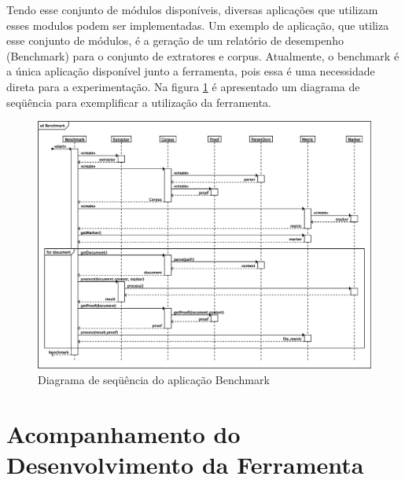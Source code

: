\documentclass[12pt, a4paper]{article}
\begin{document}
Tendo esse conjunto de módulos disponíveis, diversas aplicações que
utilizam esses modulos podem ser implementadas.
Um exemplo de aplicação, que utiliza esse conjunto de módulos, é a geração de
um relatório de desempenho (Benchmark) para o conjunto de
extratores e corpus. Atualmente, o benchmark é a única aplicação
disponível junto a ferramenta, pois essa é uma necessidade direta para a
experimentação. Na figura \ref{sequencia} é apresentado um diagrama de seqüência para
exemplificar a utilização da ferramenta.

\begin{figure}[htb!]
  \begin{center}
  \includegraphics[width=15cm]{img/fastbenchmark.eps}
  \caption{Diagrama de seqüência do aplicação Benchmark}
  \label{sequencia}
  \end{center}
\end{figure}

\section{Acompanhamento do Desenvolvimento da Ferramenta}
\end{document}
